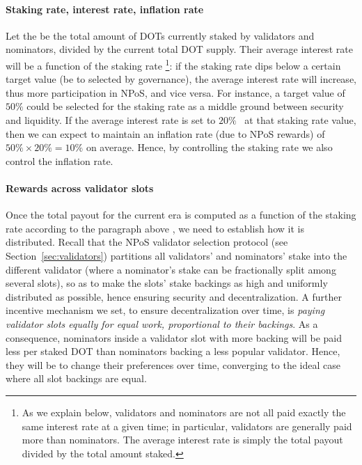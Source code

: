 \paragraph{Staking rate, interest rate, inflation rate}  Let the  be the total amount of DOTs 
currently staked by validators and nominators, divided by the current total DOT supply. 
Their average interest rate will be a function of the staking rate%
\footnote{As we explain below, validators and nominators are not all paid exactly the same 
interest rate at a given time; in particular, validators are generally paid more than nominators.  
The average interest rate is simply the total payout divided by the total amount staked.}:
if the staking rate dips below a certain target value (be to selected by governance), 
the average interest rate will increase, thus  more participation in NPoS, and vice versa. 
For instance, a target value of $50\%$ could be selected for the staking rate as a middle ground between security 
and liquidity. If the average interest rate is set to $20\%$ ~at that staking rate value, 
then we can expect to maintain an inflation rate (due to NPoS rewards) of $50\%\times 20\% = 10\%$ on average. 
Hence, by controlling the staking rate we also control the inflation rate. 


\paragraph{Rewards across validator slots} Once the total payout for the current era is computed 
as a function of the staking rate according to the paragraph above , we need to establish how it is distributed.
Recall that the NPoS validator selection protocol (see Section~\ref{sec:validators}) 
partitions all validators' and nominators' stake into the different validator  
(where a nominator's stake can be fractionally split among several slots), so as to make the slots' 
stake backings as high and  uniformly distributed as possible, hence ensuring security and decentralization. 
A further incentive mechanism we set, to ensure decentralization over time, 
is \emph{paying validator slots equally for equal work,  proportional to their backings}. 
As a consequence, nominators inside a validator slot with more backing will be paid less per staked DOT 
than nominators backing a less popular validator. Hence, they will be  to change 
their preferences over time, converging to the ideal case where all slot backings are equal.


